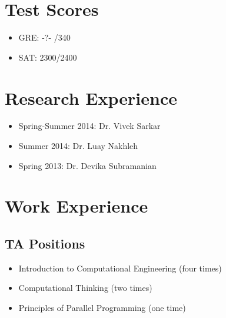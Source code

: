 \documentclass[12pt]{article}
\begin{document}
\section{Test Scores}

\begin{itemize}
    \item{GRE: -?- /340}
    \item{SAT: 2300/2400}
\end{itemize}











\section{Research Experience}

\begin{itemize}
    \item{Spring-Summer 2014: Dr. Vivek Sarkar}
    \item{Summer 2014: Dr. Luay Nakhleh}
    \item{Spring 2013: Dr. Devika Subramanian}
\end{itemize}





\section{Work Experience}

\subsection{TA Positions}

\begin{itemize}
    \item{Introduction to Computational Engineering (four times)}
    \item{Computational Thinking (two times)}
    \item{Principles of Parallel Programming (one time)}
\end{itemize}
\end{document}
